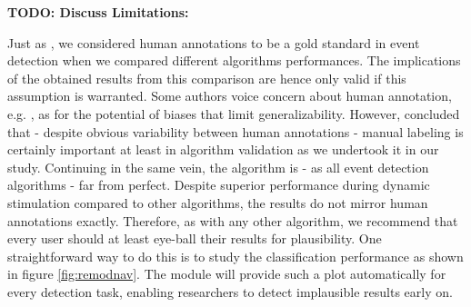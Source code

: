     \textbf{TODO: Discuss Limitations:}

    Just as \cite{Andersson2017}, we considered human annotations to be a gold standard in event detection when we
    compared different algorithms performances. The implications of the obtained results from this comparison are hence
    only valid if this assumption is warranted. Some authors voice concern about human annotation, e.g. \cite{5523936},
    as for the potential of biases that limit generalizability. However, \cite{Hooge2018} concluded that - despite
    obvious variability between human annotations - manual labeling is certainly important at least in algorithm
    validation as we undertook it in our study. Continuing in the same vein, the \remodnav algorithm is - as all event
    detection algorithms - far from perfect. Despite superior performance during dynamic stimulation compared to other
    algorithms, the results do not mirror human annotations exactly. Therefore, as with any other algorithm, we recommend
    that every user should at least eye-ball their results for plausibility. One straightforward way to do this is to
    study the classification performance as shown in figure \ref{fig:remodnav}. The \remodnav module will provide such a
    plot automatically for every detection task, enabling researchers to detect implausible results early on. \\



